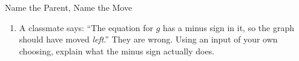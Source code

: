 \documentclass[10pt]{article}
\begin{document}
\begin{notesbox}{Name the Parent, Name the Move}
\begin{enumerate}[leftmargin=1.6em, itemsep=8pt, topsep=4pt]
\item A classmate says: ``The equation for $g$ has a minus sign in it, so the graph should have
moved \emph{left}.'' They are wrong. Using an input of your own choosing, explain what the minus
sign actually does.

\\
\\
\\

\end{enumerate}
\end{notesbox}
\end{document}
